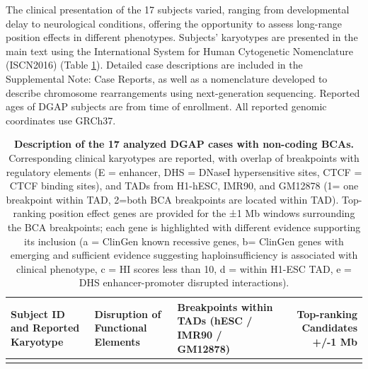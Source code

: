 \documentclass[a4paper,twoside=true,openright,parskip=full,chapterprefix=true,11pt,headings=normal,bibliography=totoc,listof=totoc,titlepage=on,captions=tableabove,draft=false]{scrreprt}
\theoremstyle{definition}
\theoremstyle{definition}
\theoremstyle{definition}
\theoremstyle{remark}
\begin{document}
The clinical presentation of the 17 subjects varied, ranging from
developmental delay to neurological conditions, offering the opportunity
to assess long-range position effects in different phenotypes. Subjects'
karyotypes are presented in the main text using the International System
for Human Cytogenetic Nomenclature (ISCN2016) (Table
\ref{tab:position-effect-subjects}). Detailed case descriptions are
included in the Supplemental Note: Case Reports, as well as a
nomenclature developed to describe chromosome rearrangements using
next-generation sequencing.\citep{Ordulu2014} Reported ages of DGAP
subjects are from time of enrollment. All reported genomic coordinates
use GRCh37.

\begin{longtable}[]{@{}lllr@{}}
\caption{\label{tab:position-effect-subjects} \textbf{Description of the 17
analyzed DGAP cases with non-coding BCAs.} Corresponding clinical
karyotypes are reported, with overlap of breakpoints with regulatory
elements (E = enhancer, DHS = DNaseI hypersensitive sites, CTCF = CTCF
binding sites), and TADs from H1-hESC, IMR90, and GM12878 (1= one
breakpoint within TAD, 2=both BCA breakpoints are located within TAD).
Top-ranking position effect genes are provided for the ±1 Mb windows
surrounding the BCA breakpoints; each gene is highlighted with different
evidence supporting its inclusion (a = ClinGen known recessive genes, b=
ClinGen genes with emerging and sufficient evidence suggesting
haploinsufficiency is associated with clinical phenotype, c = HI scores
less than 10, d = within H1-ESC TAD, e = DHS enhancer-promoter disrupted
interactions).}\tabularnewline
\toprule
\begin{minipage}[b]{0.25\columnwidth}\raggedright
\textbf{Subject ID and Reported Karyotype}\strut
\end{minipage} & \begin{minipage}[b]{0.19\columnwidth}\raggedright
\textbf{Disruption of Functional Elements}\strut
\end{minipage} & \begin{minipage}[b]{0.26\columnwidth}\raggedright
\textbf{Breakpoints within TADs (hESC / IMR90 / GM12878)}\strut
\end{minipage} & \begin{minipage}[b]{0.18\columnwidth}\raggedleft
\textbf{Top-ranking Candidates +/-1 Mb }\strut
\end{minipage}\tabularnewline
\midrule
\endfirsthead
\toprule
\begin{minipage}[b]{0.25\columnwidth}\raggedright

\end{minipage}
\end{longtable}
\end{document}
